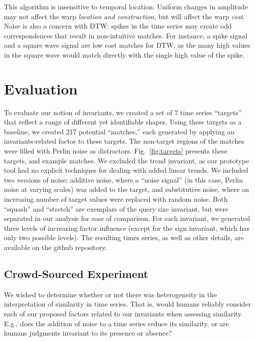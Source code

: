 This algorithm is insensitive to temporal location. Uniform changes in amplitude may not affect the warp \emph{location and construction}, but will affect the warp \emph{cost}. Noise is also a concern with DTW: spikes in the time series may create odd correspondences that result in non-intuitive matches. For instance, a spike signal and a square wave signal are low cost matches for DTW, as the many high values in the square wave would match directly with the single high value of the spike.

\section{Evaluation}
\targetFig
\expFig

To evaluate our notion of invariants, we created a set of 7 time series ``targets'' that reflect a range of different yet identifiable shapes. Using these targets as a baseline, we created 217 potential ``matches,'' each generated by applying an invariants-related factor to these targets. The non-target regions of the matches were filled with Perlin noise as distractors. Fig.~\ref{fig:targets} presents these targets, and example matches. We excluded the trend invariant, as our prototype tool had no explicit techniques for dealing with added linear trends. We included two versions of noise: additive noise, where a ``noise signal'' (in this case, Perlin noise at varying scales) was added to the target, and substitutive noise, where an increasing number of target values were replaced with random noise. Both ``squash'' and ``stretch'' are exemplars of the query size invariant, but were separated in our analysis for ease of comparison. For each invariant, we generated three levels of increasing factor influence (except for the sign invariant, which has only two possible levels). The resulting times series, as well as other details, are available on the github repository. 

\subsection{Crowd-Sourced Experiment}

We wished to determine whether or not there was heterogeneity in the interpretation of similarity in time series. That is, would humans reliably consider each of our proposed factors related to our invariants when assessing similarity. E.g., does the addition of noise to a time series reduce its similarity, or are humans judgments invariant to its presence or absence?

